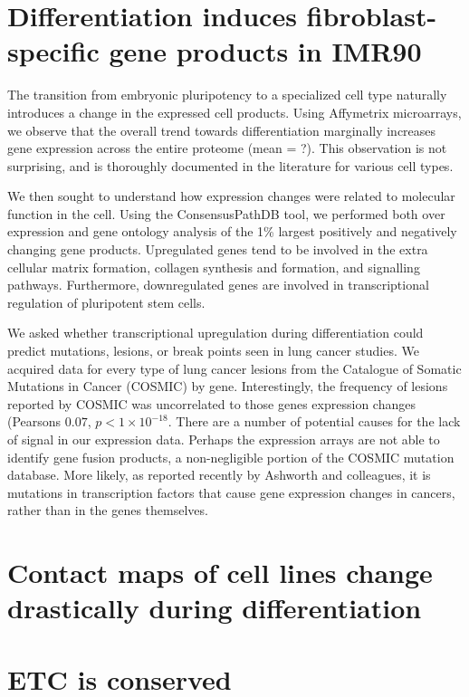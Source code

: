 \documentclass[phd,tocprelim]{cornell}
\begin{document}
\section{Differentiation induces fibroblast-specific gene products in IMR90}

The transition from embryonic pluripotency to a specialized cell type naturally introduces a change in the expressed cell products.
Using Affymetrix microarrays, we observe that the overall trend towards differentiation marginally increases gene expression across
the entire proteome (mean = ?).  This observation is not surprising, and is thoroughly documented in the literature\cite{tuomela2012}
for various cell types.

We then sought to understand how expression changes were related to molecular function in the cell.  Using the ConsensusPathDB
tool\cite{kamburov2012}, we performed both over expression and gene ontology analysis of the 1\%  largest positively and negatively
changing gene products.  Upregulated genes tend to be involved in the extra cellular matrix formation, collagen synthesis and formation,
and signalling pathways.  Furthermore, downregulated genes are involved in transcriptional regulation of pluripotent stem cells.

We asked whether transcriptional upregulation during differentiation could predict mutations, lesions, or break points seen in lung
cancer studies.  We acquired data for every type of lung cancer lesions from the Catalogue of Somatic Mutations in Cancer
(COSMIC)\cite{forbes2009} by gene.  Interestingly, the frequency of lesions reported by COSMIC was uncorrelated to those genes
expression changes (Pearsons $0.07$, $p < 1 \times 10^{-18}$.  There are a number of potential causes for the lack of signal in
our expression data.  Perhaps the expression arrays are not able to identify gene fusion products, a non-negligible portion of
the COSMIC mutation database.  More likely, as reported recently by Ashworth and colleagues, it is mutations in transcription factors
that cause gene expression changes in cancers, rather than in the genes themselves\cite{ashworth2014}.

\section{Contact maps of cell lines change drastically during differentiation}

\section{ETC is conserved}
\end{document}
